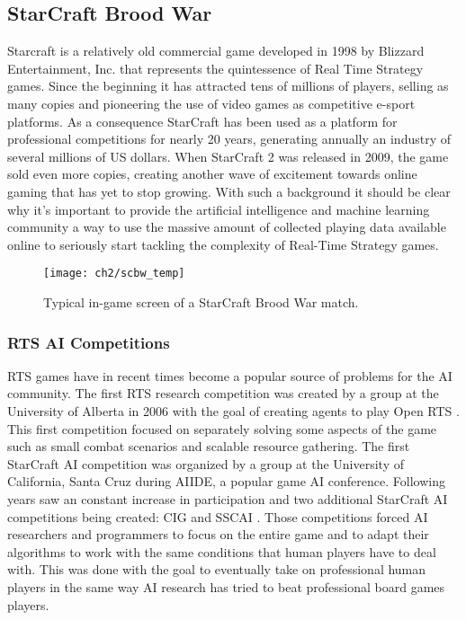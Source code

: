 \subsection{StarCraft Brood War}

Starcraft is a relatively old commercial game developed in 1998 by Blizzard
Entertainment, Inc. that represents the quintessence of Real Time Strategy
games. Since the beginning it has attracted tens of millions of players, selling
as many copies and pioneering the use of video games as competitive e-sport
platforms. As a consequence StarCraft has been used as a platform for
professional competitions for nearly 20 years, generating annually an industry
of several millions of US dollars. When StarCraft 2 was released in 2009, the
game sold even more copies, creating another wave of excitement towards online
gaming that has yet to stop growing. With such a background it should be clear
why it's important to provide the artificial intelligence and machine learning
community a way to use the massive amount of collected playing data available
online to seriously start tackling the complexity of Real-Time Strategy games.

\begin{figure}[h]
    \centering
    \texttt{[image: ch2/scbw\_temp]}
    \caption{Typical in-game screen of a StarCraft Brood War match.}
    \label{fig:ALE}
\end{figure}

\subsubsection{RTS AI Competitions}

RTS games have in recent times become a popular source of problems for the AI
community. The first RTS research competition was created by a group at the
University of Alberta in 2006 with the goal of creating agents to play Open RTS
\citep{openrts}. This first competition focused on separately solving some
aspects of the game such as small combat scenarios and scalable resource
gathering. The first StarCraft AI competition was organized by a group at the
University of California, Santa Cruz during AIIDE, a popular game AI conference.
Following years saw an constant increase in participation and two additional
StarCraft AI competitions being created: CIG and SSCAI \citep{sscai}. Those
competitions forced AI researchers and programmers to focus on the entire game
and to adapt their algorithms to work with the same conditions that human
players have to deal with. This was done with the goal to eventually take on
professional human players in the same way AI research has tried to beat
professional board games players.

